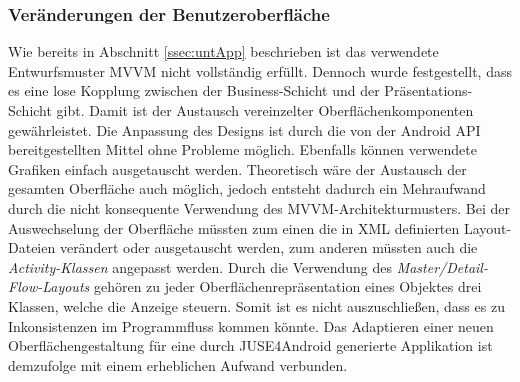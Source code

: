 \documentclass[a4paper,twoside]{article}
\begin{document}
\subsubsection{Veränderungen der Benutzeroberfläche}
Wie bereits in Abschnitt \ref{ssec:untApp} beschrieben ist das verwendete Entwurfsmuster MVVM nicht vollständig erfüllt. Dennoch wurde festgestellt, dass es eine lose Kopplung zwischen der Business-Schicht und der Präsentations-Schicht gibt. Damit ist der Austausch vereinzelter Oberflächenkomponenten gewährleistet. Die Anpassung des Designs ist durch die von der Android API bereitgestellten Mittel ohne Probleme möglich. Ebenfalls können verwendete Grafiken einfach ausgetauscht werden. Theoretisch wäre der Austausch der gesamten Oberfläche auch möglich, jedoch entsteht dadurch ein Mehraufwand durch die nicht konsequente Verwendung des MVVM-Architekturmusters. Bei der Auswechselung der Oberfläche müssten zum einen die in XML definierten Layout-Dateien verändert oder ausgetauscht werden, zum anderen müssten auch die \textit{Activity-Klassen} angepasst werden. Durch die Verwendung des \textit{Master/Detail-Flow-Layouts} gehören zu jeder Oberflächenrepräsentation eines Objektes drei Klassen, welche die Anzeige steuern. Somit ist es nicht auszuschließen, dass es zu Inkonsistenzen im Programmfluss kommen könnte. Das Adaptieren einer neuen Oberflächengestaltung für eine durch JUSE4Android generierte Applikation ist demzufolge mit einem erheblichen Aufwand verbunden.
\\
\end{document}
